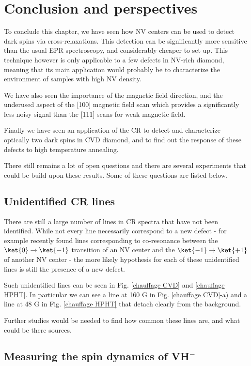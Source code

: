 \documentclass[a4paper, 11pt]{report}
\begin{document}
\section{Conclusion and perspectives}

To conclude this chapter, we have seen how NV centers can be used to detect dark spins via cross-relaxations. This detection can be significantly more sensitive than the usual EPR spectroscopy, and considerably cheaper to set up. This technique however is only applicable to a few defects in NV-rich diamond, meaning that its main application would probably be to characterize the environment of samples with high NV density.

We have also seen the importance of the magnetic field direction, and the underused aspect of the [100] magnetic field scan which provides a significantly less noisy signal than the [111] scans for weak magnetic field.

Finally we have seen an application of the CR to detect and characterize optically two dark spins in CVD diamond, and to find out the response of these defects to high temperature annealing.

There still remains a lot of open questions and there are several experiments that could be build upon these results. Some of these questions are listed below.

\subsection{Unidentified CR lines}

There are still a large number of lines in CR spectra that have not been identified. While not every line necessarily correspond to a new defect - for example \citep{wunderlich2021magnetic} recently found lines corresponding to co-resonance between the $\ket{0} \to \ket{-1}$ transition of an NV center and the $\ket{-1} \to \ket{+1}$ of another NV center - the more likely hypothesis for each of these unidentified lines is still the presence of a new defect.

Such unidentified lines can be seen in Fig. \ref{chauffage CVD} and \ref{chauffage HPHT}. In particular we can see a line at 160 G in Fig. \ref{chauffage CVD}-a) and a line at 48 G in Fig. \ref{chauffage HPHT} that detach clearly from the background. 

Further studies would be needed to find how common these lines are, and what could be there sources.

\subsection{Measuring the spin dynamics of VH$^-$}
\end{document}
